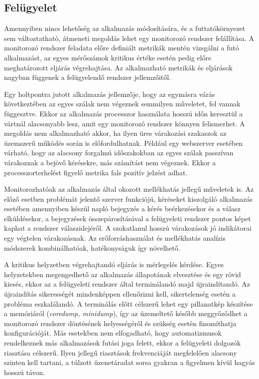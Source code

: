     \subsection{Felügyelet} 
    Amennyiben nincs lehetőség az alkalmazás módosítására, és a futtatókörnyezet sem változtatható, átmeneti megoldás lehet egy monitorozó rendszer felállítása. A monitorozó rendszer feladata előre definiált metrikák mentén vizsgálni a futó alkalmazást, az egyes mérőszámok kritikus értéke esetén pedig előre meghatározott eljárás végrehajtása. Az alkalmazható metrikák és eljárások nagyban függenek a felügyelendő rendszer jellemzőitől.
    
    Egy holtpontra jutott alkalmazás jellemzője, hogy az egymásra várás következtében az egyes szálak nem végeznek semmilyen műveletet, fel vannak függesztve. Ekkor az alkalmazás processzor használata hosszú időn keresztül a vártnál alacsonyabb lesz, amit egy monitorozó rendszer könnyen felismerhet. A megoldás nem alkalmazható akkor, ha ilyen üres várakozási szakaszok az üzemszerű működés során is előfordulhatnak. Például egy webszerver esetében várható, hogy az alacsony forgalmú időszakokban az egyes szálak passzívan várakoznak a bejövő kérésekre, más számítást nem végeznek. Ekkor a processzorterhelést figyelő metrika fals pozitív jelzést adhat.
    
    Monitorozhatóak az alkalmazás által okozott mellékhatás jellegű műveletek is. Az előző esetben problémát jelentő szerver funkciójú, kéréseket kiszolgáló alkalmazás esetében amennyiben készül napló bejegyzés a kérés beérkezésekor és a válasz elküldésekor, a bejegyzések összepárosításával a felügyeleti rendszer pontos képet kaphat a rendszer válaszidejéről. A szokatlanul hosszú várakozások jó indikátorai egy végtelen várakozásnak. Az erőforráshasználat és mellékhatás analízis módszerek kombinálhatóak, hatékonyságuk így növelhető.
    
    A kritikus helyzetben végrehajtandó eljárás is mérlegelés kérdése. Egyes helyzetekben megengedhető az alkalmazás állapotának elvesztése és egy rövid kiesés, ekkor az a felügyeleti rendszer által terminálandó majd újraindítandó. Az újraindítás sikerességét mindenképpen ellenőrizni kell, sikertelenség esetén a probléma eszkalálandó. A terminálás előtt célszerű lehet egy pillanatkép készítése a memóriáról (\emph{coredump, minidump}), így az üzemeltető később meggyőződhet a monitorozó rendszer döntésének helyességéről és szükség esetén finomíthatja konfigurációját. Más esetekben nem elfogadható, hogy automatizmusok rendelkeznek más alkalmazások futási joga felett, ekkor a felügyeleti dolgozók riasztása célszerű. Ilyen jellegű riasztások frekvenciáját megfelelően alacsony szinten kell tartani, a túlzott üzenetáradat sorsa gyakran a figyelmen kívül hagyás hosszú távon.
    
